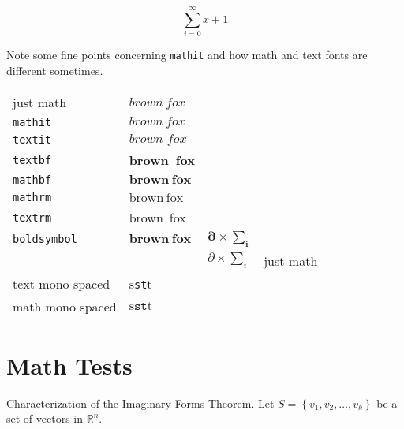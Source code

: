 \[\sum_{i=0}^{\infty} x + 1\]

Note some fine points concerning \texttt{mathit} and
how math and text fonts are different sometimes.

\begin{center}
  \begin{tabular}[c]{|l|l|l|l|}
    just math & $brown~fox$ \\
    \texttt{mathit} & $\mathit{brown~fox}$ \\
    \texttt{textit} & $\textit{brown~fox}$ \\
    \texttt{textbf}& \textbf{brown~fox} \\
    \texttt{mathbf}& $\mathbf{brown~fox}$ \\
    \texttt{mathrm}& $\mathrm{brown~fox}$ \\
    \texttt{textrm}& \textrm{brown~fox} \\
    \texttt{boldsymbol}& $\boldsymbol{brown~fox}$ & $\boldsymbol{\partial\times\sum_i}$\\
              && $\partial\times\sum_i$&just math \\
    text mono spaced& s\texttt{st}t &\\
    math mono spaced& $\mathrm{s}\mathtt{st}\mathrm{t}$&
  \end{tabular}
\end{center}


\section{Math Tests}

Characterization of the Imaginary Forms
Theorem.
Let $S=\left\{v_1, v_2, \ldots, v_k\right\}$ be a set of vectors in $\mathbb{R}^n$.


